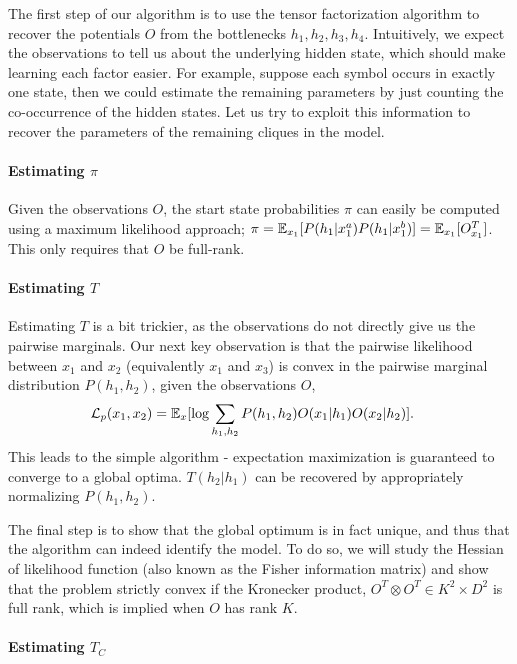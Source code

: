The first step of our algorithm is to use the tensor factorization
  algorithm to recover the potentials $O$ from the bottlenecks $h_1,
  h_2, h_3, h_4$. 
Intuitively, we expect the observations to tell us about the underlying
  hidden state, which should make learning each factor easier. 
For example, suppose each symbol occurs in exactly one state, then we
  could estimate the remaining parameters by just counting the
  co-occurrence of the hidden states.
Let us try to exploit this information to recover the parameters of the
  remaining cliques in the model.

\paragraph{Estimating $\pi$}

Given the observations $O$, the start state probabilities $\pi$ can
  easily be computed using a maximum likelihood approach; $\pi =
  \mathbb{E}_{x_1}[P(h_1|x^a_1) P(h_1|x^b_1)] = \mathbb{E}_{x_1}[O^T_{x_1}]$. This only
  requires that $O$ be full-rank.

\paragraph{Estimating $T$}

Estimating $T$ is a bit trickier, as the observations do not directly
  give us the pairwise marginals. 
Our next key observation is that the pairwise likelihood between $x_1$
  and $x_2$ (equivalently $x_1$ and $x_3$) is convex in the pairwise
  marginal distribution $P(h_1, h_2)$, given the observations $O$,
\begin{align}
  \mathcal{L}_p(x_1, x_2) &= \mathbb{E}_{x}[ \log \sum_{h_1,h_2} P(h_1, h_2) O(x_1|h_1) O(x_2|h_2)].
\end{align}
This leads to the simple algorithm - expectation maximization is
  guaranteed to converge to a global optima. $T(h_2 | h_1)$ can be
  recovered by appropriately normalizing $P(h_1, h_2)$.

The final step is to show that the global optimum is in fact unique,
  and thus that the algorithm can indeed identify the model. 
To do so, we will study the Hessian of likelihood function (also known
  as the Fisher information matrix) and show that the problem strictly
  convex if the Kronecker product, $O^T \otimes O^T \in K^2 \times D^2$ is
  full rank, which is implied when $O$ has rank $K$\verify.

\paragraph{Estimating $T_C$}


